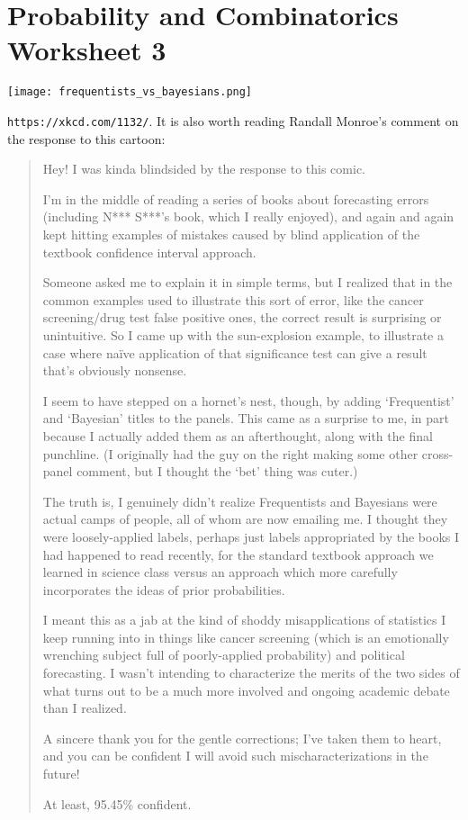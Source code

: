 \documentclass[11pt,a4paper]{scrartcl}
\begin{document}
\section*{Probability and Combinatorics Worksheet 3}


\begin{center}
\texttt{[image: frequentists\_vs\_bayesians.png]}
\end{center}
\texttt{https://xkcd.com/1132/}. It is also worth reading Randall Monroe's comment on the response to this cartoon:

\begin{quote}
Hey! I was kinda blindsided by the response to this comic.

I'm in the middle of reading a series of books about forecasting
errors (including N*** S***'s book, which I really enjoyed), and
again and again kept hitting examples of mistakes caused by blind
application of the textbook confidence interval approach.

Someone asked me to explain it in simple terms, but I realized that in
the common examples used to illustrate this sort of error, like the
cancer screening/drug test false positive ones, the correct result is
surprising or unintuitive. So I came up with the sun-explosion
example, to illustrate a case where na\"ive application of that
significance test can give a result that's obviously nonsense.

I seem to have stepped on a hornet's nest, though, by adding
`Frequentist' and `Bayesian' titles to the panels. This came as a
surprise to me, in part because I actually added them as an
afterthought, along with the final punchline. (I originally had the
guy on the right making some other cross-panel comment, but I thought
the `bet' thing was cuter.)

The truth is, I genuinely didn't realize Frequentists and Bayesians
were actual camps of people, all of whom are now emailing me. I thought
they were loosely-applied labels, perhaps just labels appropriated by
the books I had happened to read recently, for the standard textbook
approach we learned in science class versus an approach which more
carefully incorporates the ideas of prior probabilities.

I meant this as a jab at the kind of shoddy misapplications of
statistics I keep running into in things like cancer screening (which
is an emotionally wrenching subject full of poorly-applied
probability) and political forecasting. I wasn't intending to
characterize the merits of the two sides of what turns out to be a
much more involved and ongoing academic debate than I realized.

A sincere thank you for the gentle corrections; I've taken them to
heart, and you can be confident I will avoid such mischaracterizations
in the future!

At least, 95.45\% confident.
\end{quote}
\end{document}
